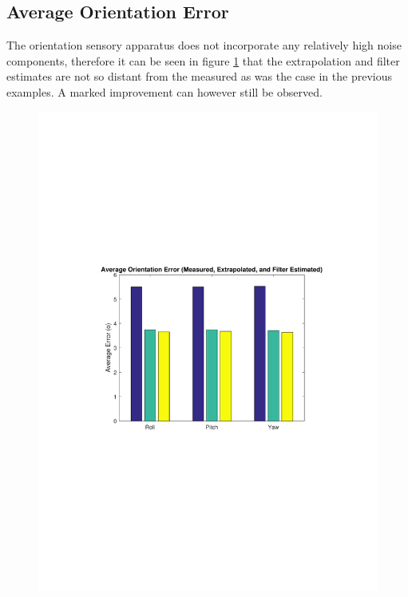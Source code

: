 \subsection{Average Orientation Error}
The orientation sensory apparatus does not incorporate any relatively high noise components, therefore it can be seen in figure \ref{fig:analysisorientation} that the extrapolation and filter estimates are not so distant from the measured as was the case in the previous examples. A marked improvement can however still be observed.

\begin{figure}[ht]
	\centering
	\includegraphics[height=0.40\textheight,trim={3cm 9.9cm 3cm 9.5cm},clip]{analysisorientation.pdf}
	\label{fig:analysisorientation}
\end{figure}





























